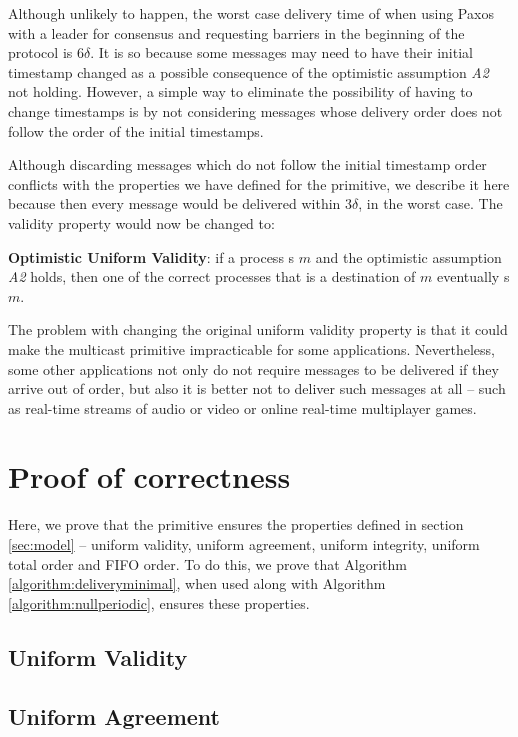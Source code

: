 \documentclass[times, 10pt]{article}
\begin{document}
Although unlikely to happen, the worst case delivery time of \cms{} when using Paxos with a leader for consensus and requesting barriers in the beginning of the protocol is $6\delta$. It is so because some messages may need to have their initial timestamp changed as a possible consequence of the optimistic assumption \emph{A2} not holding. However, a simple way to eliminate the possibility of having to change timestamps is by not considering messages whose delivery order does not follow the order of the initial timestamps.

Although discarding messages which do not follow the initial timestamp order conflicts with the properties we have defined for the \cms{} primitive, we describe it here because then every message would be delivered within $3\delta$, in the worst case. The validity property would now be changed to:

\textbf{Optimistic Uniform Validity}: if a process \cms{}s $m$ and the optimistic assumption \emph{A2} holds, then one of the correct processes that is a destination of $m$ eventually \cons{}s $m$.

The problem with changing the original uniform validity property is that it could make the multicast primitive impracticable for some applications. Nevertheless, some other applications not only do not require messages to be delivered if they arrive out of order, but also it is better not to deliver such messages at all -- such as real-time streams of audio or video or online real-time multiplayer games.


\section{Proof of correctness}
\label{sec:proofs}

Here, we prove that the \cms{} primitive ensures the properties defined in section \ref{sec:model} -- uniform validity, uniform agreement, uniform integrity, uniform total order and FIFO order. To do this, we prove that Algorithm \ref{algorithm:deliveryminimal}, when used along with Algorithm \ref{algorithm:nullperiodic}, ensures these properties.

\subsection{Uniform Validity}

\subsection{Uniform Agreement}
\end{document}
